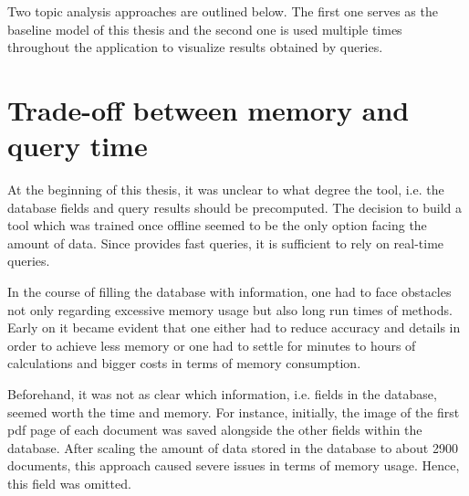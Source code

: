 Two topic analysis approaches are outlined below.
The first one serves as the baseline model of this thesis and 
the second one is used multiple times throughout the application to visualize results obtained by queries.










\section{Trade-off between memory and query time}\label{sec:trade-off}

At the beginning of this thesis, it was unclear to what degree the tool, 
i.e. the database fields and query results should be precomputed.
The decision to build a tool which was trained once offline seemed to be the only option facing the amount of data.
Since \databaseName{} provides fast queries, it is sufficient to rely on real-time queries.

In the course of filling the database with information, 
one had to face obstacles not only regarding excessive memory usage but also long run times of methods.
Early on it became evident that one either had to reduce accuracy and details in order to achieve less memory or 
one had to settle for minutes to hours of calculations and bigger costs in terms of memory consumption.

Beforehand, it was not as clear which information, i.e. fields in the database, seemed worth the time and memory.
For instance, initially, the image of the first \ac{pdf} page of each document was saved alongside the other fields within the database.
After scaling the amount of data stored in the database to about 2900 documents, 
this approach caused severe issues in terms of memory usage.
Hence, this field was omitted.